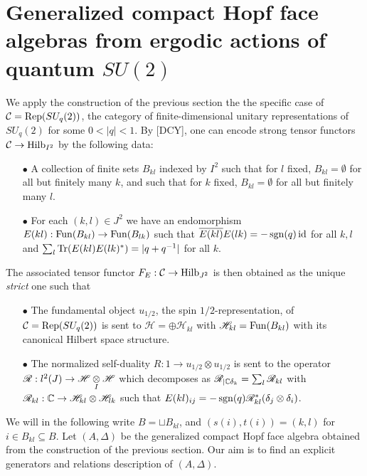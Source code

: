 \section{Generalized compact Hopf face algebras from ergodic actions
  of quantum $SU(2)$}



We apply the construction of the previous section the the specific case of $\mathcal{C} = \mathrm{Rep}(SU_q(2))$, the category of finite-dimensional unitary representations of $SU_q(2)$ for some $0<|q|<1$. By [DCY], one can encode strong tensor functors $\mathcal{C}\rightarrow \mathrm{Hilb}_{I^2}$ by the following data:
\begin{itemize}
\item[$\bullet$] A collection of finite sets $B_{kl}$ indexed by $I^2$ such that for $l$ fixed, $B_{kl} = \emptyset$ for all but finitely many $k$, and such that for $k$ fixed, $B_{kl}=\emptyset$ for all but finitely many $l$.
\item[$\bullet$] For each $(k,l)\in J^2$ we have an endomorphism $E(kl): \mathrm{Fun}(B_{kl})\rightarrow \mathrm{Fun}(B_{lk})$ such that $\overline{E(kl)}E(lk) = -\operatorname{\mathrm{sgn}}(q)\operatorname{id}$ for all $k,l$ and $\sum_l \mathrm{Tr}(E(kl)E(lk)^*) = |q+q^{-1}|$ for all $k$.
\end{itemize}

The associated tensor functor $F_E:\mathcal{C}\rightarrow \mathrm{Hilb}_{J^2}$ is then obtained as the unique \emph{strict} one such that

\begin{itemize}
 \item[$\bullet$] The fundamental object $u_{1/2}$, the spin $1/2$-representation, of $\mathcal{C}=\mathrm{Rep}(SU_q(2))$ is sent to $\mathscr{H} = \oplus \mathscr{H}_{kl}$ with $\mathscr{H}_{kl} = \mathrm{Fun}(B_{kl})$ with its canonical Hilbert space structure.
 \item[$\bullet$] The normalized self-duality $R: 1\rightarrow u_{1/2}\otimes u_{1/2}$ is sent to the operator $\mathscr{R}:l^2(J)\rightarrow \mathscr{H}\underset{I}{\otimes} \mathscr{H}$ which decomposes as $\mathscr{R}_{\mid\mathbb{C}\delta_k} = \sum_l \mathscr{R}_{kl}$ with $\mathscr{R}_{kl}:\mathbb{C}\rightarrow \mathscr{H}_{kl}\otimes \mathscr{H}_{lk}$ such that $E(kl)_{ij} = -\operatorname{\mathrm{sgn}}(q)\mathscr{R}_{kl}^*(\delta_j\otimes \delta_i)$.
\end{itemize}

We will in the following write $B=\sqcup B_{kl}$, and $(s(i),t(i))=(k,l)$ for $i\in B_{kl}\subseteq B$. Let $(A,\Delta)$ be the generalized compact Hopf face algebra obtained from the construction of the previous section. Our aim is to find an explicit generators and relations description of $(A,\Delta)$.

